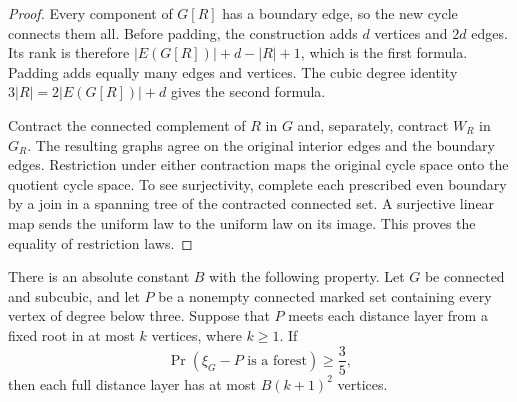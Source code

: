 \begin{proof}
Every component of $G[R]$ has a boundary edge, so the new cycle connects them all.
Before padding, the construction adds $d$ vertices and $2d$ edges.
Its rank is therefore $|E(G[R])|+d-|R|+1$, which is the first formula.
Padding adds equally many edges and vertices.
The cubic degree identity $3|R|=2|E(G[R])|+d$ gives the second formula.

Contract the connected complement of $R$ in $G$ and, separately, contract $W_R$ in $G_R$.
The resulting graphs agree on the original interior edges and the boundary edges.
Restriction under either contraction maps the original cycle space onto the quotient cycle space.
To see surjectivity, complete each prescribed even boundary by a join in a spanning tree of the contracted connected set.
A surjective linear map sends the uniform law to the uniform law on its image.
This proves the equality of restriction laws.
\end{proof}

\begin{lemma}
\label{lem:path-qualitative-marker-width}
There is an absolute constant $B$ with the following property.
Let $G$ be connected and subcubic, and let $P$ be a nonempty connected marked set containing every vertex of degree below three.
Suppose that $P$ meets each distance layer from a fixed root in at most $k$ vertices, where $k\ge1$.
If
\[
 \Pr(\xi_G-P\text{ is a forest})\ge\frac35,
\]
then each full distance layer has at most $B(k+1)^2$ vertices.
\end{lemma}

